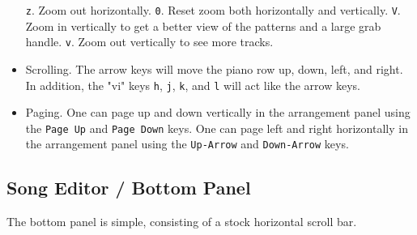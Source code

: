\begin{itemize}
         \texttt{z}. Zoom out horizontally.
         \texttt{0}. Reset zoom both horizontally and vertically.
         \texttt{V}. Zoom in vertically to get a better view of the patterns
            and a large grab handle.
         \texttt{v}. Zoom out vertically to see more tracks.
      \item Scrolling.
         The arrow keys will move the piano row up, down, left, and right.
         In addition, the "vi" keys \texttt{h}, \texttt{j}, \texttt{k}, and
         \texttt{l} will act like the arrow keys.
      \item Paging.
      One can page up and down vertically in the arrangement
      panel using the
      \texttt{Page Up} and 
      \texttt{Page Down} keys.
      One can page left and right horizontally in the arrangement
      panel using the
       \texttt{Up-Arrow} and 
       \texttt{Down-Arrow} keys.
   \end{itemize}

\subsection{Song Editor / Bottom Panel}
\label{subsec:song_editor_bottom}

   The bottom panel is simple, consisting of a stock horizontal scroll bar.

\begin{comment}

   ...and a small button, called the \textbf{Grow} button, labelled with a
   "\textbf{$>$}".
   \index{grow button}
   \index{song editor!grow}
   The \textbf{Grow} button adds to the number of measures that exist
   in the song editor. The visual effect is very subtle, resulting only
   in a small change in the thumb of the horizontal scroll-bar, unless one
   is at the right end of the piano roll.  Then, one can see the added
   measures.  Usually about 128 at a time are added, but this depends on the
   value of PPQN in force.

\end{comment}

